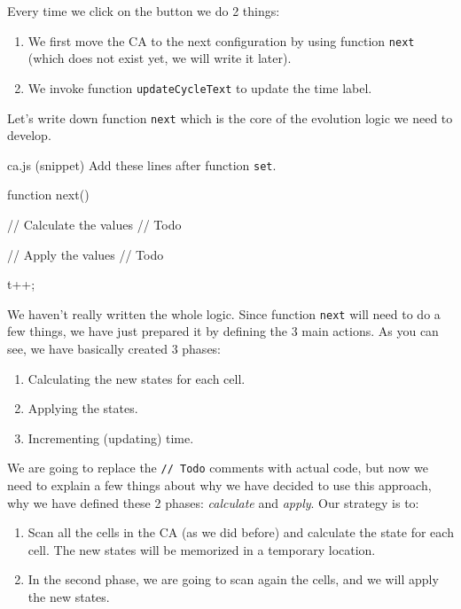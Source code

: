Every time we click on the button we do 2 things:

\begin{enumerate}
\item We first move the CA to the next configuration by using
function \texttt{next} (which does not exist yet, we will write it later).
\item We invoke function \texttt{updateCycleText} to update the time label.
\end{enumerate}

Let's write down function \texttt{next} which is the core of the evolution logic we need to develop.

\begin{programcode}{ca.js (snippet)}
Add these lines after function \texttt{set}.
\begin{code}
function next() {
    // Calculate the values
    // Todo

    // Apply the values
    // Todo

    t++;
}
\end{code}
\end{programcode}

We haven't really written the whole logic. Since function \texttt{next} will need to do a few things, we
have just prepared it by defining the 3 main actions. As you can see, we have basically created 3 phases:

\begin{enumerate}
\item Calculating the new states for each cell.
\item Applying the states.
\item Incrementing (updating) time.
\end{enumerate}

We are going to replace the \texttt{// Todo} comments with actual code, but now we need to explain a few
things about why we have decided to use this approach, why we have defined these 2 phases: 
\textit{calculate} and \textit{apply}. Our strategy is to:

\begin{enumerate}
\item Scan all the cells in the CA (as we did before) and calculate the state for each cell.
The new states will be memorized in a temporary location.
\item In the second phase, we are going to scan again the cells, and we will apply the new states.
\end{enumerate}

